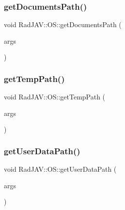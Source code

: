 \mbox{\label{class_rad_j_a_v_1_1_o_s_acc151d58456468bb6e2b17bea321d326}} 
\subsubsection{\texorpdfstring{get\+Documents\+Path()}{getDocumentsPath()}}
{\footnotesize\ttfamily void Rad\+J\+A\+V\+::\+O\+S\+::get\+Documents\+Path (\begin{DoxyParamCaption}\item[{const v8\+::\+Function\+Callback\+Info$<$ v8\+::\+Value $>$ \&}]{args }\end{DoxyParamCaption})\hspace{0.3cm}{\ttfamily [static]}}

\mbox{\label{class_rad_j_a_v_1_1_o_s_a4cf0d596d582f1c75c208dd576979f85}} 
\subsubsection{\texorpdfstring{get\+Temp\+Path()}{getTempPath()}}
{\footnotesize\ttfamily void Rad\+J\+A\+V\+::\+O\+S\+::get\+Temp\+Path (\begin{DoxyParamCaption}\item[{const v8\+::\+Function\+Callback\+Info$<$ v8\+::\+Value $>$ \&}]{args }\end{DoxyParamCaption})\hspace{0.3cm}{\ttfamily [static]}}

\mbox{\label{class_rad_j_a_v_1_1_o_s_a6bb1ba10acf9fdfbdd88e192ecb651f7}} 
\subsubsection{\texorpdfstring{get\+User\+Data\+Path()}{getUserDataPath()}}
{\footnotesize\ttfamily void Rad\+J\+A\+V\+::\+O\+S\+::get\+User\+Data\+Path (\begin{DoxyParamCaption}\item[{const v8\+::\+Function\+Callback\+Info$<$ v8\+::\+Value $>$ \&}]{args }\end{DoxyParamCaption})\hspace{0.3cm}{\ttfamily [static]}}

